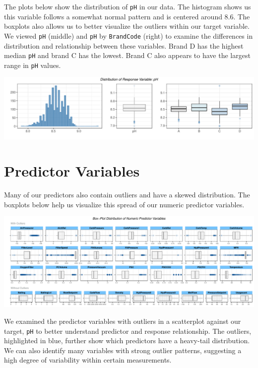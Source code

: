 \documentclass[]{report}
\begin{document}
The plots below show the distribution of \texttt{pH} in our data. The
histogram shows us this variable follows a somewhat normal pattern and
is centered around 8.6. The boxplots also allows us to better visualize
the outliers within our target variable. We viewed \texttt{pH} (middle)
and \texttt{pH} by \texttt{BrandCode} (right) to examine the differences
in distribution and relationship between these variables. Brand D has
the highest median \texttt{pH} and brand C has the lowest. Brand C also
appears to have the largest range in \texttt{pH} values.

\includegraphics{Proj2-JM_files/figure-latex/unnamed-chunk-2-1.pdf}

\hypertarget{predictor-variables}{%
\section{Predictor Variables}\label{predictor-variables}}

Many of our predictors also contain outliers and have a skewed
distribution. The boxplots below help us visualize this spread of our
numeric predictor variables.

\includegraphics{Proj2-JM_files/figure-latex/unnamed-chunk-3-1.pdf}

We examined the predictor variables with outliers in a scatterplot
against our target, \texttt{pH} to better understand predictor and
response relationship. The outliers, highlighted in blue, further show
which predictors have a heavy-tail distribution. We can also identify
many variables with strong outlier patterns, suggesting a high degree of
variability within certain measurements.
\end{document}
